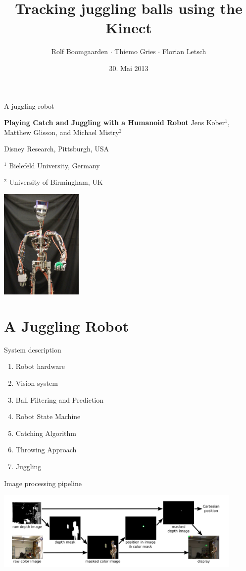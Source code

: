 \documentclass{beamer}
\title{Tracking juggling balls using the Kinect}
\author[Rolf $\cdot$ Thiemo $\cdot$ Flo]{Rolf Boomgaarden $\cdot$ Thiemo Gries $\cdot$ Florian Letsch}
\institute{Universität Hamburg}
\date{30. Mai 2013}
\begin{document}
\frame
{
\titlepage
}

\begin{frame}{A juggling robot}

\textbf{Playing Catch and Juggling with a Humanoid Robot}
Jens Kober$^{1}$, Matthew Glisson, and Michael Mistry$^{2}$

Disney Research, Pittsburgh, USA

$^{1}$ Bielefeld University, Germany

$^{2}$ University of Birmingham, UK

\begin{center}\includegraphics[width=4cm]{img/robot.png}\end{center}
   
\end{frame}

\frame
{
\tableofcontents
}

\section{A Juggling Robot}


\begin{frame}{System description}
\begin{enumerate}
\item Robot hardware
\item Vision system
\item Ball Filtering and Prediction
\item Robot State Machine
\item Catching Algorithm
\item Throwing Approach
\item Juggling
\end{enumerate}
\end{frame}

\begin{frame}{Image processing pipeline}
\begin{center}\includegraphics[width=12cm]{img/img-processing.png}\end{center}
\end{frame}
\end{document}

